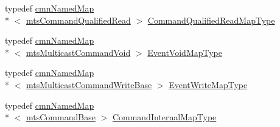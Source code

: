 \begin{DoxyCompactItemize}
typedef \hyperlink{classcmn_named_map}{cmn\-Named\-Map}\\*
$<$ \hyperlink{classmts_command_qualified_read}{mts\-Command\-Qualified\-Read} $>$ \hyperlink{classmts_interface_provided_a08e212add6d96324bf5e029d09349a04}{Command\-Qualified\-Read\-Map\-Type}
\item 
typedef \hyperlink{classcmn_named_map}{cmn\-Named\-Map}\\*
$<$ \hyperlink{classmts_multicast_command_void}{mts\-Multicast\-Command\-Void} $>$ \hyperlink{classmts_interface_provided_a81dc5f40eef8155cfc0ddad74c5c1b6a}{Event\-Void\-Map\-Type}
\item 
typedef \hyperlink{classcmn_named_map}{cmn\-Named\-Map}\\*
$<$ \hyperlink{classmts_multicast_command_write_base}{mts\-Multicast\-Command\-Write\-Base} $>$ \hyperlink{classmts_interface_provided_a98f1388a3c2119a1ae97f19302eeb550}{Event\-Write\-Map\-Type}
\item 
typedef \hyperlink{classcmn_named_map}{cmn\-Named\-Map}\\*
$<$ \hyperlink{classmts_command_base}{mts\-Command\-Base} $>$ \hyperlink{classmts_interface_provided_afbea756c205cd50db2a0884681ad650a}{Command\-Internal\-Map\-Type}
\end{DoxyCompactItemize}
